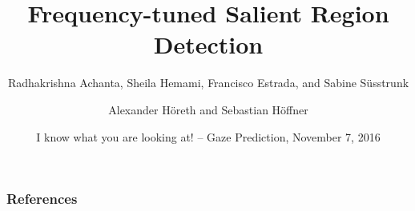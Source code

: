 \documentclass{beamer}
\title{Frequency-tuned Salient Region Detection}
\subtitle{Radhakrishna Achanta, Sheila Hemami, Francisco Estrada, and Sabine Süsstrunk}
\author{Alexander Höreth and Sebastian Höffner}
\institute{Institute of Cognitive Science\\University of Osnabrück}
\date[Nov 7, 2016]{I know what you are looking at! -- Gaze Prediction, November 7, 2016}
\begin{document}
\frame{\titlepage}

\begin{frame}
    \frametitle{References}
    \nocite{achanta}
    
\end{frame}
\end{document}
